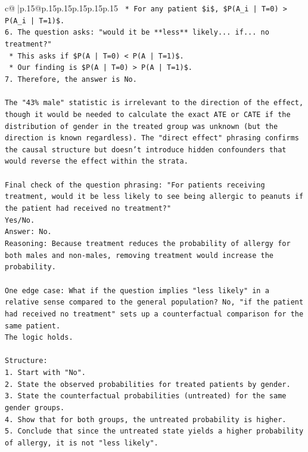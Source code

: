 \documentclass{article}
\begin{document}
{\begin{supertabular}{c@{$\;$}|p{.15\linewidth}@{}p{.15\linewidth}p{.15\linewidth}p{.15\linewidth}p{.15\linewidth}p{.15\linewidth}}
{{{\texttt{    *   For any patient \$i\$, \$P(A\_i | T=0) > P(A\_i | T=1)\$.} \\
\texttt{6.  The question asks: "would it be **less** likely... if... no treatment?"} \\
\texttt{    *   This asks if \$P(A | T=0) < P(A | T=1)\$.} \\
\texttt{    *   Our finding is \$P(A | T=0) > P(A | T=1)\$.} \\
\texttt{7.  Therefore, the answer is No.} \\
\\ 
\texttt{The "43\% male" statistic is irrelevant to the direction of the effect, though it would be needed to calculate the exact ATE or CATE if the distribution of gender in the treated group was unknown (but the direction is known regardless). The "direct effect" phrasing confirms the causal structure but doesn't introduce hidden confounders that would reverse the effect within the strata.} \\
\\ 
\texttt{Final check of the question phrasing: "For patients receiving treatment, would it be less likely to see being allergic to peanuts if the patient had received no treatment?"} \\
\texttt{Yes/No.} \\
\texttt{Answer: No.} \\
\texttt{Reasoning: Because treatment reduces the probability of allergy for both males and non{-}males, removing treatment would increase the probability.} \\
\\ 
\texttt{One edge case: What if the question implies "less likely" in a relative sense compared to the general population? No, "if the patient had received no treatment" sets up a counterfactual comparison for the same patient.} \\
\texttt{The logic holds.} \\
\\ 
\texttt{Structure:} \\
\texttt{1. Start with "No".} \\
\texttt{2. State the observed probabilities for treated patients by gender.} \\
\texttt{3. State the counterfactual probabilities (untreated) for the same gender groups.} \\
\texttt{4. Show that for both groups, the untreated probability is higher.} \\
\texttt{5. Conclude that since the untreated state yields a higher probability of allergy, it is not "less likely".} \\
}}}
\end{supertabular}}
\end{document}
